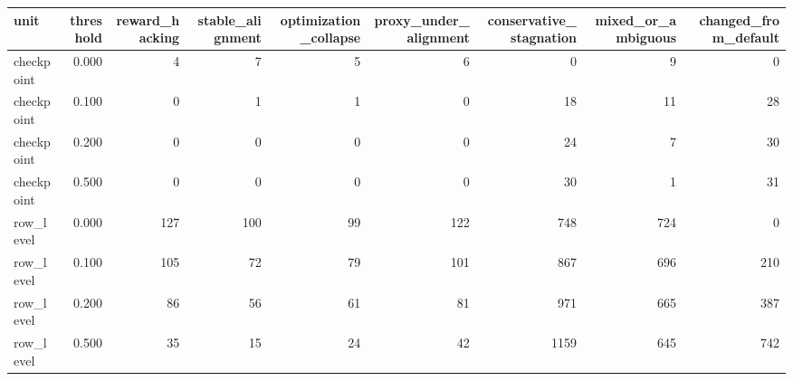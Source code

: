 \begin{tabular}{lrrrrrrrr}
\toprule
unit & threshold & reward_hacking & stable_alignment & optimization_collapse & proxy_under_alignment & conservative_stagnation & mixed_or_ambiguous & changed_from_default \\
\midrule
checkpoint & 0.000 & 4 & 7 & 5 & 6 & 0 & 9 & 0 \\
checkpoint & 0.100 & 0 & 1 & 1 & 0 & 18 & 11 & 28 \\
checkpoint & 0.200 & 0 & 0 & 0 & 0 & 24 & 7 & 30 \\
checkpoint & 0.500 & 0 & 0 & 0 & 0 & 30 & 1 & 31 \\
row_level & 0.000 & 127 & 100 & 99 & 122 & 748 & 724 & 0 \\
row_level & 0.100 & 105 & 72 & 79 & 101 & 867 & 696 & 210 \\
row_level & 0.200 & 86 & 56 & 61 & 81 & 971 & 665 & 387 \\
row_level & 0.500 & 35 & 15 & 24 & 42 & 1159 & 645 & 742 \\
\bottomrule
\end{tabular}
